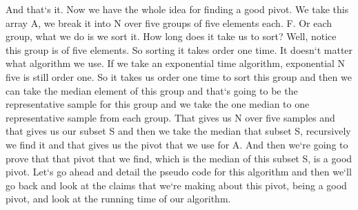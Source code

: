 And that`s it.
Now we have the whole idea for finding a good pivot.
We take this array A, we break it into N over five groups of five elements each.
F\@.
Or each group, what we do is we sort it.
How long does it take us to sort? Well, notice this group is of five elements.
So sorting it takes order one time.
It doesn`t matter what algorithm we use.
If we take an exponential time algorithm, exponential N five is still order one.
So it takes us order one time to sort this group and then we can take the median element of this group and that`s going to be the representative sample for this group and we take the one median to one representative sample from each group.
That gives us N over five samples and that gives us our subset S and then we take the median that subset S, recursively we find it and that gives us the pivot that we use for A\@.
And then we`re going to prove that that pivot that we find, which is the median of this subset S, is a good pivot.
Let`s go ahead and detail the pseudo code for this algorithm and then we`ll go back and look at the claims that we`re making about this pivot, being a good pivot, and look at the running time of our algorithm.

